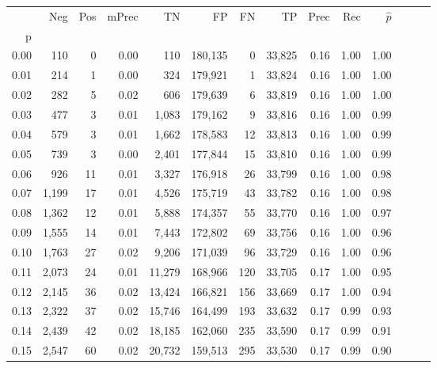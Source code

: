 \begin{tabular}{rrrrrrrrrrrrrr}
\toprule
{} &    Neg &  Pos & mPrec &       TN &       FP &      FN &      TP &  Prec &   Rec & $\hat{p}$ \\
p    &        &      &       &          &          &         &         &       &       &           \\
\midrule
0.00 &    110 &    0 &  0.00 &      110 &  180,135 &       0 &  33,825 &  0.16 &  1.00 &      1.00 \\
0.01 &    214 &    1 &  0.00 &      324 &  179,921 &       1 &  33,824 &  0.16 &  1.00 &      1.00 \\
0.02 &    282 &    5 &  0.02 &      606 &  179,639 &       6 &  33,819 &  0.16 &  1.00 &      1.00 \\
0.03 &    477 &    3 &  0.01 &    1,083 &  179,162 &       9 &  33,816 &  0.16 &  1.00 &      0.99 \\
0.04 &    579 &    3 &  0.01 &    1,662 &  178,583 &      12 &  33,813 &  0.16 &  1.00 &      0.99 \\
0.05 &    739 &    3 &  0.00 &    2,401 &  177,844 &      15 &  33,810 &  0.16 &  1.00 &      0.99 \\
0.06 &    926 &   11 &  0.01 &    3,327 &  176,918 &      26 &  33,799 &  0.16 &  1.00 &      0.98 \\
0.07 &  1,199 &   17 &  0.01 &    4,526 &  175,719 &      43 &  33,782 &  0.16 &  1.00 &      0.98 \\
0.08 &  1,362 &   12 &  0.01 &    5,888 &  174,357 &      55 &  33,770 &  0.16 &  1.00 &      0.97 \\
0.09 &  1,555 &   14 &  0.01 &    7,443 &  172,802 &      69 &  33,756 &  0.16 &  1.00 &      0.96 \\
0.10 &  1,763 &   27 &  0.02 &    9,206 &  171,039 &      96 &  33,729 &  0.16 &  1.00 &      0.96 \\
0.11 &  2,073 &   24 &  0.01 &   11,279 &  168,966 &     120 &  33,705 &  0.17 &  1.00 &      0.95 \\
0.12 &  2,145 &   36 &  0.02 &   13,424 &  166,821 &     156 &  33,669 &  0.17 &  1.00 &      0.94 \\
0.13 &  2,322 &   37 &  0.02 &   15,746 &  164,499 &     193 &  33,632 &  0.17 &  0.99 &      0.93 \\
0.14 &  2,439 &   42 &  0.02 &   18,185 &  162,060 &     235 &  33,590 &  0.17 &  0.99 &      0.91 \\
0.15 &  2,547 &   60 &  0.02 &   20,732 &  159,513 &     295 &  33,530 &  0.17 &  0.99 &      0.90 \\

\end{tabular}
